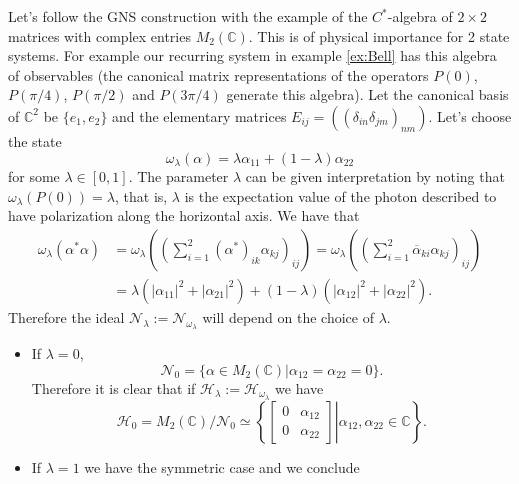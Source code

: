 \begin{example}\label{example:M2}
Let's follow the GNS construction with the example of the $C^*$-algebra of $2\times 2$ matrices with complex entries $M_2(\mathbb{C})$. This is of physical importance for 2 state systems. For example our recurring system in example \ref{ex:Bell} has this algebra of observables (the canonical matrix representations of the operators $P(0)$, $P(\pi/4)$, $P(\pi/2)$ and $P(3\pi/4)$ generate this algebra). Let the canonical basis of $\mathbb{C}^2$ be $\{e_1, e_2\}$ and the elementary matrices $E_{ij} = ((\delta_{in}\delta_{jm})_{nm})$. Let's choose the state
\begin{equation}
\omega_\lambda(\alpha) = \lambda \alpha_{11} + (1-\lambda)\alpha_{22}
\end{equation} 
for some $\lambda\in [0,1]$. The parameter $\lambda$ can be given interpretation by noting that $\omega_\lambda(P(0))=\lambda$, that is, $\lambda$ is the expectation value of the photon described to have polarization along the horizontal axis. We have that
\begin{align}
\omega_\lambda (\alpha^*\alpha) & = \omega_\lambda\left(\left(\sum_{i=1}^2 (\alpha^*)_{ik}\alpha_{kj}\right)_{ij}\right) = \omega_\lambda\left(\left(\sum_{i=1}^2 \overline{\alpha}_{ki}\alpha_{kj}\right)_{ij}\right) \\
& = \lambda(|\alpha_{11}|^2+|\alpha_{21}|^2) + (1-\lambda)(|\alpha_{12}|^2+|\alpha_{22}|^2). \nonumber
\end{align}
Therefore the ideal $\mathcal{N}_\lambda := \mathcal{N}_{\omega_\lambda}$ will depend on the choice of $\lambda$.
\begin{itemize}
\item If $\lambda = 0$, 
\begin{equation}
\mathcal{N}_0 = \{\alpha\in M_2(\mathbb{C})|\alpha_{12}=\alpha_{22}=0\}.
\end{equation}
Therefore it is clear that if $\mathcal{H}_\lambda:=\mathcal{H}_{\omega_\lambda}$ we have
\begin{equation}
\mathcal{H}_0=M_2(\mathbb{C})/\mathcal{N}_0\simeq\left\{\left.\begin{bmatrix}
0 & \alpha_{12} \\
0 & \alpha_{22}
\end{bmatrix}\right|\alpha_{12},\alpha_{22}\in\mathbb{C}\right\}.
\end{equation}
\item If $\lambda = 1 $ we have the symmetric case and we conclude
\begin{equation}

\end{equation}
\end{itemize}
\end{example}
